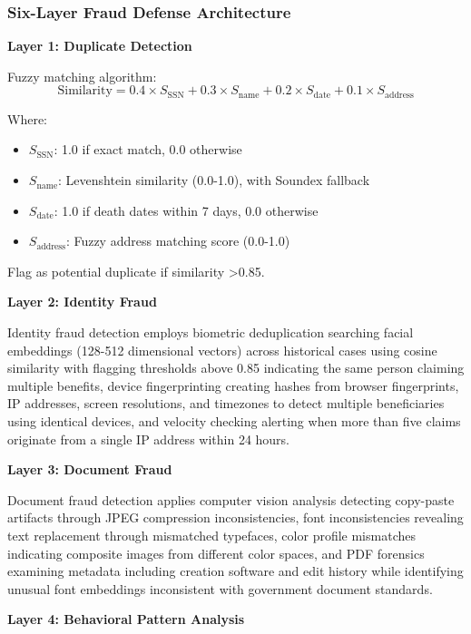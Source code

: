 \subsubsection{Six-Layer Fraud Defense Architecture}

\textbf{Layer 1: Duplicate Detection}

Fuzzy matching algorithm:
\begin{equation}
\text{Similarity} = 0.4 \times S_{\text{SSN}} + 0.3 \times S_{\text{name}} + 0.2 \times S_{\text{date}} + 0.1 \times S_{\text{address}}
\end{equation}

Where:
\begin{itemize}
\item $S_{\text{SSN}}$: 1.0 if exact match, 0.0 otherwise
\item $S_{\text{name}}$: Levenshtein similarity (0.0-1.0), with Soundex fallback
\item $S_{\text{date}}$: 1.0 if death dates within 7 days, 0.0 otherwise
\item $S_{\text{address}}$: Fuzzy address matching score (0.0-1.0)
\end{itemize}

Flag as potential duplicate if similarity >0.85.

\textbf{Layer 2: Identity Fraud}

Identity fraud detection employs biometric deduplication searching facial embeddings (128-512 dimensional vectors) across historical cases using cosine similarity with flagging thresholds above 0.85 indicating the same person claiming multiple benefits, device fingerprinting creating hashes from browser fingerprints, IP addresses, screen resolutions, and timezones to detect multiple beneficiaries using identical devices, and velocity checking alerting when more than five claims originate from a single IP address within 24 hours.

\textbf{Layer 3: Document Fraud}

Document fraud detection applies computer vision analysis detecting copy-paste artifacts through JPEG compression inconsistencies, font inconsistencies revealing text replacement through mismatched typefaces, color profile mismatches indicating composite images from different color spaces, and PDF forensics examining metadata including creation software and edit history while identifying unusual font embeddings inconsistent with government document standards.

\textbf{Layer 4: Behavioral Pattern Analysis}

